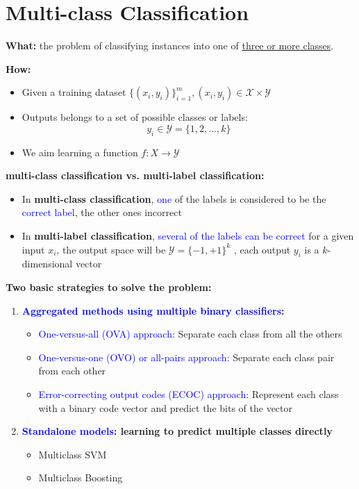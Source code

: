 \documentclass[12pt, a4paper]{article}
\let\stdsection\section
\renewcommand\section{\newpage\stdsection} %
\begin{document}
\section{Multi-class Classification}\label{multi-class-classification}

\textbf{What:} the problem of classifying instances into one of \uline{three or more classes}.


\textbf{How:}

\begin{itemize}
  \item Given a training dataset $\{(x_i,y_i)\}^m_{i=1},(x_i,y_i) \in \mathcal{X} \times \mathcal{Y}$
  \item Outputs belongs to a set of possible classes or labels: $$y_i \in \mathcal{Y} = \{1,2,...,k\}$$
  \item We aim learning a function $f: X \to \mathcal{Y}$
\end{itemize}

\textbf{multi-class classification vs. multi-label classification:}
\begin{itemize}
  \item In \textbf{multi-class classification}, \textcolor{blue}{one} of the labels is considered to be the \textcolor{blue}{correct label}, the other ones incorrect
  \item In \textbf{multi-label classification}, \textcolor{blue}{several of the labels can be correct} for a given input $x_i$, the output space will be $\mathcal{Y} = \{-1, +1\}^k$ , each output $y_i$ is a $k$-dimensional vector
\end{itemize}


\textbf{Two basic strategies to solve the problem:}

\begin{enumerate}
  \item \textbf{\textcolor{blue}{Aggregated methods using multiple binary classifiers}:}
  \begin{itemize}
    \item \textcolor{blue}{One-versus-all (OVA) approach}: Separate each class from all the others
    \item \textcolor{blue}{One-versus-one (OVO) or all-pairs approach}: Separate each class pair from each other
    \item \textcolor{blue}{Error-correcting output codes (ECOC) approach}: Represent each class with a binary code vector and predict the bits of the vector
  \end{itemize}
  \item  \textbf{\textcolor{blue}{Standalone models}: learning to predict multiple classes directly}
  \begin{itemize}
    \item Multiclass SVM
    \item Multiclass Boosting
  \end{itemize}
\end{enumerate}
\end{document}
